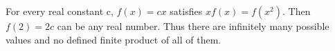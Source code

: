 For every real constant c, $f(x)=cx$ satisfies $xf(x)=f(x^2)$. Then $f(2)=2c$ can be any real number. Thus there are infinitely many possible values and no defined finite product of all of them.
